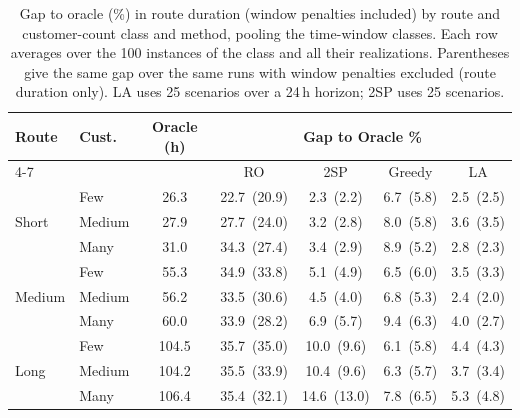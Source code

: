 \begin{table}[htbp]
\centering
\caption{Gap to oracle (\%) in route duration (window penalties included) by route and customer-count class and method, pooling the time-window classes.  Each row averages over the 100 instances of the class and all their realizations.  Parentheses give the same gap over the same runs with window penalties excluded (route duration only).  LA uses 25 scenarios over a 24\,h horizon; 2SP uses 25 scenarios.}
\label{tab:gap-simplified}
\begin{tabular}{ll c cccc}
\toprule
\multirow{2}{*}{\textbf{\small Route}} & \multirow{2}{*}{\textbf{\small Cust.}} & \multirow{2}{*}{\textbf{Oracle (h)}} &
\multicolumn{4}{c}{\textbf{Gap to Oracle \%}} \\
\cmidrule(lr){4-7}
 & & & RO & 2SP & Greedy & LA \\
\midrule
\multirow{3}{*}{\small Short} & {\small Few} & 26.3 & 22.7~{\scriptsize(20.9)} & 2.3~{\scriptsize(2.2)} & 6.7~{\scriptsize(5.8)} & 2.5~{\scriptsize(2.5)} \\
 & {\small Medium} & 27.9 & 27.7~{\scriptsize(24.0)} & 3.2~{\scriptsize(2.8)} & 8.0~{\scriptsize(5.8)} & 3.6~{\scriptsize(3.5)} \\
 & {\small Many} & 31.0 & 34.3~{\scriptsize(27.4)} & 3.4~{\scriptsize(2.9)} & 8.9~{\scriptsize(5.2)} & 2.8~{\scriptsize(2.3)} \\
\midrule
\multirow{3}{*}{\small Medium} & {\small Few} & 55.3 & 34.9~{\scriptsize(33.8)} & 5.1~{\scriptsize(4.9)} & 6.5~{\scriptsize(6.0)} & 3.5~{\scriptsize(3.3)} \\
 & {\small Medium} & 56.2 & 33.5~{\scriptsize(30.6)} & 4.5~{\scriptsize(4.0)} & 6.8~{\scriptsize(5.3)} & 2.4~{\scriptsize(2.0)} \\
 & {\small Many} & 60.0 & 33.9~{\scriptsize(28.2)} & 6.9~{\scriptsize(5.7)} & 9.4~{\scriptsize(6.3)} & 4.0~{\scriptsize(2.7)} \\
\midrule
\multirow{3}{*}{\small Long} & {\small Few} & 104.5 & 35.7~{\scriptsize(35.0)} & 10.0~{\scriptsize(9.6)} & 6.1~{\scriptsize(5.8)} & 4.4~{\scriptsize(4.3)} \\
 & {\small Medium} & 104.2 & 35.5~{\scriptsize(33.9)} & 10.4~{\scriptsize(9.6)} & 6.3~{\scriptsize(5.7)} & 3.7~{\scriptsize(3.4)} \\
 & {\small Many} & 106.4 & 35.4~{\scriptsize(32.1)} & 14.6~{\scriptsize(13.0)} & 7.8~{\scriptsize(6.5)} & 5.3~{\scriptsize(4.8)} \\
\bottomrule
\end{tabular}
\end{table}
